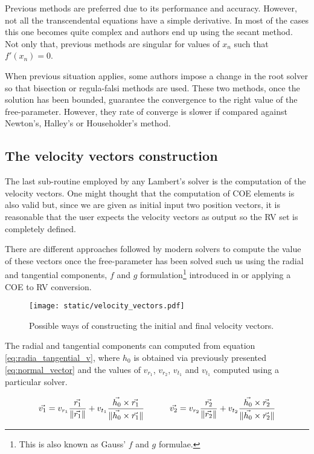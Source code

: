 Previous methods are preferred due to its performance and accuracy. However, not
all the transcendental equations have a simple derivative. In most of the cases
this one becomes quite complex and authors end up using the secant method. Not
only that, previous methods are singular for values of $x_n$ such that
$f'(x_n)=0$.

When previous situation applies, some authors impose a change in the root solver
so that bisection or regula-falsi methods are used. These two methods, once the
solution has been bounded, guarantee the convergence to the right value of the
free-parameter. However, they rate of converge is slower if compared against
Newton's, Halley's or Householder's method.

\subsection{The velocity vectors construction}

The last sub-routine employed by any Lambert's solver is the computation of the
velocity vectors. One might thought that the computation of COE elements is also
valid but, since we are given as initial input two position vectors, it is
reasonable that the user expects the velocity vectors as output so the RV set is
completely defined.

There are different approaches followed by modern solvers to compute the value
of these vectors once the free-parameter has been solved such us using the
radial and tangential components, $f$ and $g$ formulation\footnote{This is also
  known as Gauss' $f$ and $g$ formulae.} introduced in \cite{bate1971} or applying a
COE to RV conversion.

\vspace{0.5cm}
\begin{figure}[h]
  \centering
  \texttt{[image: static/velocity\_vectors.pdf]}
  \caption[Velocity vectors construction]{Possible ways of constructing the initial and final velocity vectors.}
  \label{fig:velocity_vectors}
\end{figure}

The radial and tangential components can computed from equation
\ref{eq:radia_tangential_v}, where $h_0$ is obtained via previously presented
\ref{eq:normal_vector} and the values of $v_{r_1}$, $v_{r_2}$, $v_{t_1}$ and
$v_{t_1}$ computed using a particular solver.

\begin{equation}
  \vec{v_{1}} = v_{r_1} \frac{\vec{r_1}}{\lVert\vec{r_1}\rVert} + v_{t_1} \frac{\vec{h_0} \times \vec{r_1}}{\lVert\vec{h_0} \times \vec{r_1}\rVert}\quad\quad\quad
  \vec{v_{2}} = v_{r_2} \frac{\vec{r_2}}{\lVert\vec{r_2}\rVert} + v_{t_2} \frac{\vec{h_0} \times \vec{r_2}}{\lVert\vec{h_0} \times \vec{r_2}\rVert}
  \label{eq:radia_tangential_v}
\end{equation}

